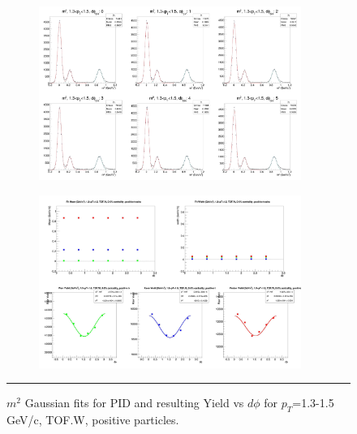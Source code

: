 \begin{figure}[H]
  \centering
    \begin{subfigure}[p]{1\textwidth}
   \centering
   \includegraphics[width=0.94\textwidth]{lowptfits/yieldvsdphi_tof1_cent0_ch1_pT-13-15.jpg}
    \end{subfigure}
    \begin{subfigure}[p]{1\textwidth}
   \centering
   \includegraphics[width=0.94\textwidth]{lowptfits/fitParams_tof1_cent0_ch1_pT-13-15.jpg}
    \end{subfigure}
    \rule{35em}{0.5pt}
  \caption[PID fits and Yield vs $d\phi$ for $p_T$=1.3-1.5 GeV/c, TOF.W, positive particles. ]{$m^2$ Gaussian fits for PID and resulting Yield vs $d\phi$ for $p_T$=1.3-1.5 GeV/c, TOF.W, positive particles.}
  \label{fig:fits13-15pos}
\end{figure}


